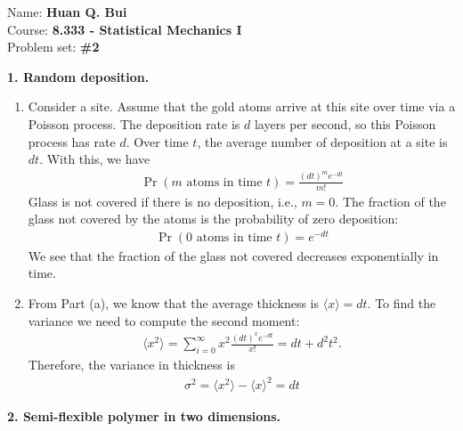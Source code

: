 \documentclass{article}
\theoremstyle{definition}
\newcommand{\f}[2]{\frac{#1}{#2}}
\begin{document}
		\begin{framed}
			\noindent Name: \textbf{Huan Q. Bui}\\
			Course: \textbf{8.333 - Statistical Mechanics I}\\
			Problem set: \textbf{\#2}
		\end{framed}
	



\noindent \textbf{1. Random deposition.}


\begin{enumerate}[label=(\alph*)]
	\item Consider a site. Assume that the gold atoms arrive at this site over time via a Poisson process. The deposition rate is $d$ layers per second, so this Poisson process has rate $d$. Over time $t$, the average number of deposition at a site is $dt$. With this, we have
	\begin{align*}
	\Pr(m \text{ atoms in time } t) = \boxed{\f{(dt)^m e^{-dt}}{m!}}
	\end{align*} 
	Glass is not covered if there is no deposition, i.e., $m=0$. The fraction of the glass not covered by the atoms is the probability of zero deposition:
	\begin{align*}
	\Pr(0 \text{ atoms in time } t) = \boxed{e^{-dt}}
	\end{align*}
	We see that the fraction of the glass not covered decreases exponentially in time. 
	
	
	\item From Part (a), we know that the average thickness is $\langle x \rangle = dt$. To find the variance we need to compute the second moment:
	\begin{align*}
	\langle x^2 \rangle = \sum_{i=0}^\infty x^2 \f{(dt)^x e^{-dt}}{x!}= dt + d^2t^2.
	\end{align*}
	Therefore, the variance in thickness is 
	\begin{align*}
	\sigma^2 = \langle x^2 \rangle - \langle x \rangle^2 = \boxed{dt}
	\end{align*}
\end{enumerate}



\noindent \textbf{2. Semi-flexible polymer in two dimensions. } 
\end{document}
